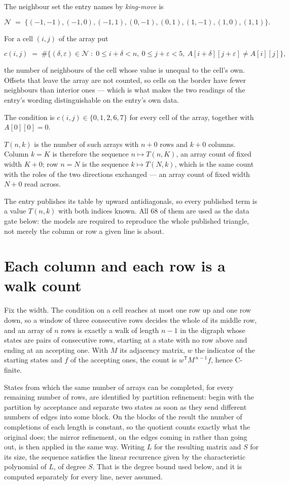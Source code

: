 \documentclass[11pt]{article}
\theoremstyle{definition}
\begin{document}
The neighbour set the entry names by {\itshape king-move} is

\[\mathcal{N} \;=\; \{(-1,-1), (-1,0), (-1,1), (0,-1), (0,1), (1,-1), (1,0), (1,1)\}.\]

For a cell $(i,j)$ of the array put

\[c(i,j) \;=\; \#\bigl\{(\delta,\varepsilon)\in\mathcal{N} \;:\; 0\le i+\delta<n,\ 0\le j+\varepsilon<5,\ A[i+\delta][j+\varepsilon] \neq A[i][j]\bigr\},\]

the number of neighbours of the cell whose value is unequal to the cell's own. Offsets that leave the array are not counted, so cells on the border have fewer neighbours than interior ones --- which is what makes the two readings of the entry's wording distinguishable on the entry's own data.

The condition is $c(i,j) \in \{0, 1, 2, 6, 7\}$ for every cell of the array, together with $A[0][0]=0$.

$T(n,k)$ is the number of such arrays with $n + 0$ rows and $k + 0$ columns. Column $k = K$ is therefore the sequence $n \mapsto T(n,K)$, an array count of fixed width $K + 0$; row $n = N$ is the sequence $k \mapsto T(N,k)$, which is the same count with the roles of the two directions exchanged --- an array count of fixed width $N + 0$ read across.

The entry publishes its table by upward antidiagonals, so every published term is a value $T(n,k)$ with both indices known. All 68 of them are used as the data gate below: the models are required to reproduce the whole published triangle, not merely the column or row a given line is about.

\section{Each column and each row is a walk count}

Fix the width. The condition on a cell reaches at most one row up and one row down, so a window of three consecutive rows decides the whole of its middle row, and an array of $n$ rows is exactly a walk of length $n-1$ in the digraph whose states are pairs of consecutive rows, starting at a state with no row above and ending at an accepting one. With $M$ its adjacency matrix, $w$ the indicator of the starting states and $f$ of the accepting ones, the count is $w^{\mathsf T}M^{\,n-1}f$, hence C-finite.

States from which the same number of arrays can be completed, for every remaining number of rows, are identified by partition refinement: begin with the partition by acceptance and separate two states as soon as they send different numbers of edges into some block. On the blocks of the result the number of completions of each length is constant, so the quotient counts exactly what the original does; the mirror refinement, on the edges coming in rather than going out, is then applied in the same way. Writing $L$ for the resulting matrix and $S$ for its size, the sequence satisfies the linear recurrence given by the characteristic polynomial of $L$, of degree $S$. That is the degree bound used below, and it is computed separately for every line, never assumed.
\end{document}
